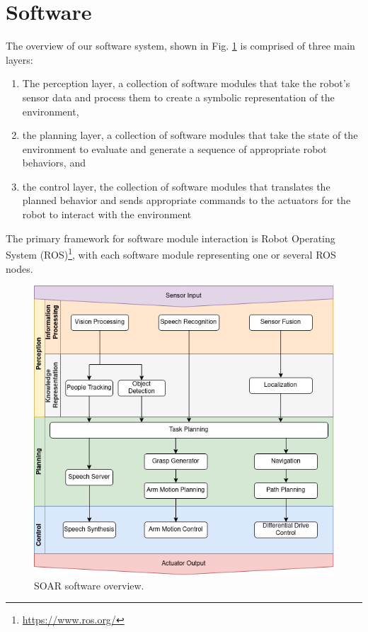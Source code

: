 \documentclass[runningheads,a4paper]{llncs}
\begin{document}
\section{Software}
The overview of our software system, shown in Fig. \ref{fig:overview} is comprised of three main layers:
\begin{enumerate}
	\item The perception layer, a collection of software modules that take the robot’s sensor data and process them to create a symbolic representation of the environment,
	\item the planning layer, a collection of software modules that take the state of the environment to evaluate and generate a sequence of appropriate robot behaviors, and
	\item the control layer, the collection of software modules that translates the planned behavior and sends appropriate commands to the actuators for the robot to interact with the environment
\end{enumerate}
The primary framework for software module interaction is Robot Operating System (ROS)\footnote{\url{https://www.ros.org/}}, with each software module representing one or several ROS nodes.

\begin{figure}[tbp]
	\centering
	\includegraphics[width=0.7\linewidth]{images/software_overview.png}
	\caption{SOAR software overview.}
	\label{fig:overview}
\end{figure}
\end{document}
